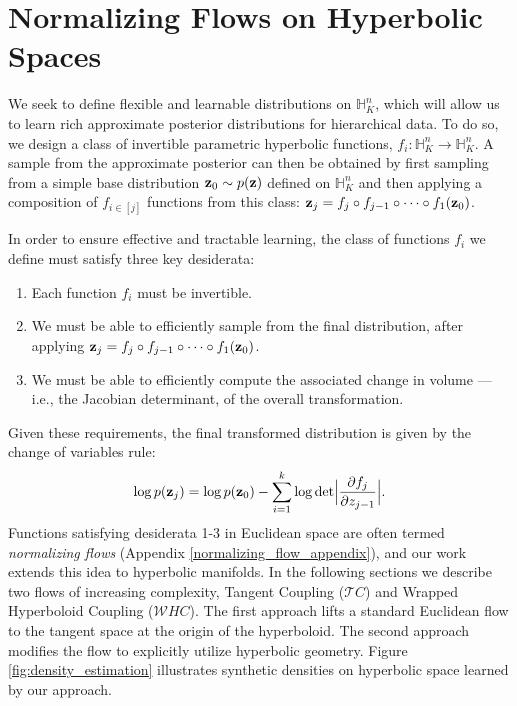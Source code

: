 \section{Normalizing Flows on Hyperbolic Spaces}
We seek to define flexible and learnable distributions on $\mathbb{H}^n_K$, which will allow us to learn rich approximate posterior distributions for hierarchical data.
To do so, we design a class of invertible parametric hyperbolic functions, $f_i: \mathbb{H}^n_K \to \mathbb{H}^n_K$.
A sample from the approximate posterior can then be obtained by first sampling from a simple base distribution $\mathbf{z}_0 \sim p(\mathbf{z})$ defined on $\mathbb{H}^n_K$ and then applying a composition of $f_{i\in[j]}$ functions from this class: $\mathbf{z}_j = f_j \circ f_{j-1} \circ \dots \circ f_1(\mathbf{z}_0)$.

In order to ensure effective and tractable learning, the class of functions $f_i$ we define must satisfy three key desiderata:
\begin{enumerate}[itemsep=0pt, parsep=0pt, topsep=0pt]
    \item Each function $f_i$ must be invertible. 
    \item We must be able to efficiently sample from the final distribution, after applying $\mathbf{z}_j = f_j \circ f_{j-1} \circ \dots \circ f_1(\mathbf{z}_0)$. 
    \item We must be able to efficiently compute the associated change in volume ---i.e., the Jacobian determinant, of the overall transformation.
\end{enumerate}
 Given these requirements, the final transformed distribution is given by the change of variables rule:
\begin{equation}
    \log p(\mathbf{z}_j) = \log p(\mathbf{z}_0) - \sum_{i=1}^k\log \textnormal{det}\Big|\frac{\partial f_j}{\partial z_{j-1}} \Big|.
\end{equation}
Functions satisfying desiderata 1-3 in Euclidean space are often termed {\em normalizing flows} (Appendix \ref{normalizing_flow_appendix}), and our work extends this idea to hyperbolic manifolds. In the following sections we describe two flows of increasing complexity, Tangent Coupling ($\mathcal{T}C$) and Wrapped Hyperboloid Coupling ($\mathcal{W}HC$). The first approach lifts a standard Euclidean flow to the tangent space at the origin of the hyperboloid.
The second approach modifies the flow to explicitly utilize hyperbolic geometry. Figure \ref{fig:density_estimation} illustrates synthetic densities on hyperbolic space learned by our approach.


